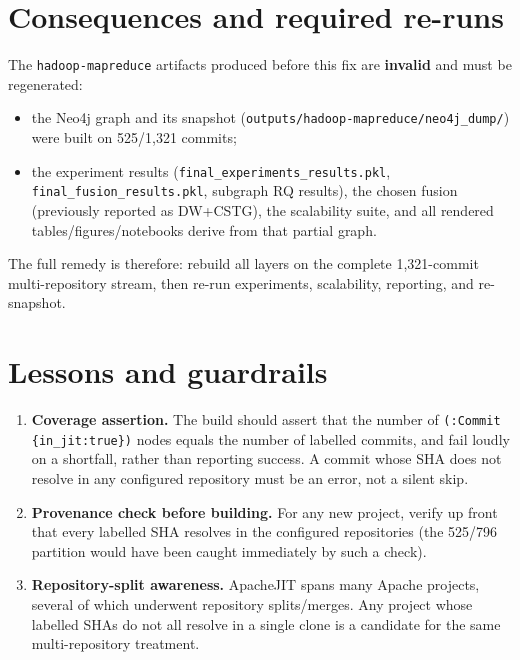 \documentclass[11pt]{article}
\newcommand{\code}[1]{\texttt{#1}}
\begin{document}
\section{Consequences and required re-runs}
The \code{hadoop-mapreduce} artifacts produced before this fix are
\textbf{invalid} and must be regenerated:

\begin{itemize}
  \item the Neo4j graph and its snapshot
  (\code{outputs/hadoop-mapreduce/neo4j\_dump/}) were built on 525/1{,}321
  commits;
  \item the experiment results (\code{final\_experiments\_results.pkl},
  \code{final\_fusion\_results.pkl}, subgraph RQ results), the chosen fusion
  (previously reported as DW+CSTG), the scalability suite, and all rendered
  tables/figures/notebooks derive from that partial graph.
\end{itemize}

The full remedy is therefore: rebuild all layers on the complete 1{,}321-commit
multi-repository stream, then re-run experiments, scalability, reporting, and
re-snapshot.

\section{Lessons and guardrails}
\label{sec:guardrails}
\begin{enumerate}
  \item \textbf{Coverage assertion.} The build should assert that the number of
  \code{(:Commit \{in\_jit:true\})} nodes equals the number of labelled commits,
  and fail loudly on a shortfall, rather than reporting success. A commit whose
  SHA does not resolve in any configured repository must be an error, not a
  silent skip.

  \item \textbf{Provenance check before building.} For any new project, verify up
  front that every labelled SHA resolves in the configured repositories (the
  525/796 partition would have been caught immediately by such a check).

  \item \textbf{Repository-split awareness.} ApacheJIT spans many Apache projects,
  several of which underwent repository splits/merges. Any project whose labelled
  SHAs do not all resolve in a single clone is a candidate for the same
  multi-repository treatment.
\end{enumerate}
\end{document}
